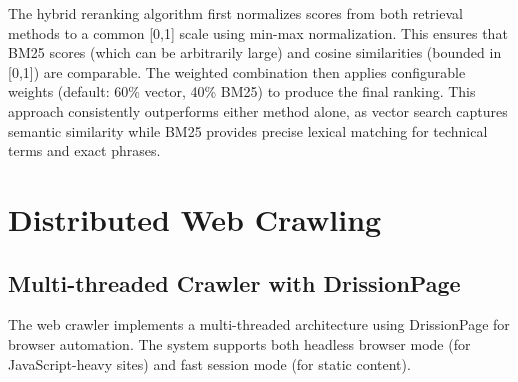 The hybrid reranking algorithm first normalizes scores from both retrieval methods to a common [0,1] scale using min-max normalization. This ensures that BM25 scores (which can be arbitrarily large) and cosine similarities (bounded in [0,1]) are comparable. The weighted combination then applies configurable weights (default: 60\% vector, 40\% BM25) to produce the final ranking. This approach consistently outperforms either method alone, as vector search captures semantic similarity while BM25 provides precise lexical matching for technical terms and exact phrases.

\clearpage

\section{Distributed Web Crawling}

\subsection{Multi-threaded Crawler with DrissionPage}

The web crawler implements a multi-threaded architecture using DrissionPage for browser automation. The system supports both headless browser mode (for JavaScript-heavy sites) and fast session mode (for static content).

